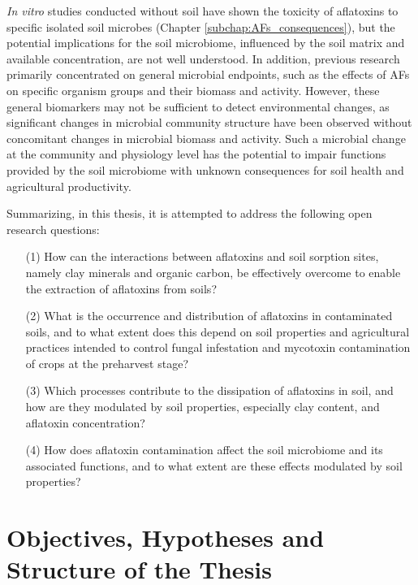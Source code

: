 \textit{In vitro} studies conducted without soil have shown the toxicity of aflatoxins to specific isolated soil microbes (Chapter \ref{subchap:AFs_consequences}), but the potential implications for the soil microbiome, influenced by the soil matrix and available concentration, are not well understood. In addition, previous research primarily concentrated on general microbial endpoints, such as the effects of AFs on specific organism groups and their biomass and activity. However, these general biomarkers may not be sufficient to detect environmental changes, as significant changes in microbial community structure have been observed without concomitant changes in microbial biomass and activity. Such a microbial change at the community and physiology level has the potential to impair functions provided by the soil microbiome with unknown consequences for soil health and agricultural productivity. 


Summarizing, in this thesis, it is attempted to address the following open research questions:

\begin{itemize}
\item[(1)] How can the interactions between aflatoxins and soil sorption sites, namely clay minerals and organic carbon, be effectively overcome to enable the extraction of aflatoxins from soils? 
\item[(2)] What is the occurrence and distribution of aflatoxins in contaminated soils, and to what extent does this depend on soil properties and agricultural practices intended to control fungal infestation and mycotoxin contamination of crops at the preharvest stage?
\item[(3)] Which processes contribute to the dissipation of aflatoxins in soil, and how are they modulated by soil properties, especially clay content, and aflatoxin concentration? 
\item[(4)] How does aflatoxin contamination affect the soil microbiome and its associated functions, and to what extent are these effects modulated by soil properties? 
\end{itemize}


\section{Objectives, Hypotheses and Structure of the Thesis}

